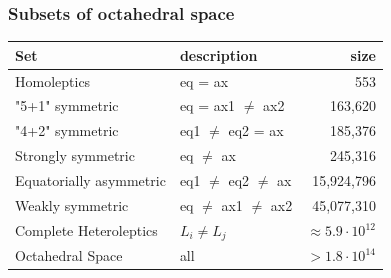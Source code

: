 \documentclass[xcolor=dvipsnames]{beamer}
\begin{document}
\begin{frame}
\frametitle{Subsets of octahedral space}
\begin{table}[]
	\centering
	\label{tab:space-sizes}
	\begin{tabular}{llr}
		\toprule
		Set 					& description		    	   & size \\
		\midrule
		Homoleptics             & eq = ax                   & 553        \\[0.1cm]
		"5+1" symmetric         & eq = ax1 $\neq$ ax2       & 163,620    \\[0.1cm]
		"4+2" symmetric         & eq1 $\neq$ eq2 = ax       & 185,376    \\[0.1cm]
		Strongly symmetric      & eq $\neq$ ax              & 245,316    \\[0.1cm]
		Equatorially asymmetric & eq1 $\neq$ eq2 $\neq$ ax  & 15,924,796 \\[0.1cm]
		Weakly symmetric        & eq $\neq$ ax1 $\neq$ ax2  & 45,077,310 \\[0.1cm]
		Complete Heteroleptics  & $L_i \neq L_j$            & $\approx 5.9 \cdot 10^{12}$ \\[0.1cm] %
		Octahedral Space        & all                       & $> 1.8 \cdot 10^{14}$ \\
		\bottomrule
	\end{tabular}
	\end{table}
\end{frame}
\end{document}
